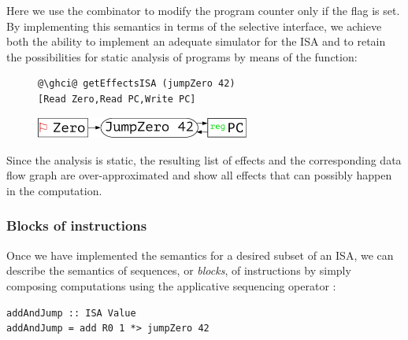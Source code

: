 \noindent
Here we use the  combinator to modify the program counter only if
the  flag is set. By implementing this semantics in terms of the
selective interface, we achieve both the ability to implement an adequate
simulator for the ISA and to retain the possibilities for static analysis of
programs by means of the  function:

\begin{figure}[!h]
 \begin{minipage}{0.45\textwidth}
\raggedleft
\begin{verbatim}
@\ghci@ getEffectsISA (jumpZero 42)
[Read Zero,Read PC,Write PC]
\end{verbatim}
 \end{minipage}
 \begin{minipage}{0.45\textwidth}
  \centering
  \includegraphics[width=7cm]{./fig/jumpZero.pdf}
 \end{minipage}
\end{figure}

\noindent
Since the analysis is static, the resulting list of effects and the
corresponding data flow graph are over-approximated and show all effects that
can possibly happen in the computation.


\subsubsection{Blocks of instructions}

Once we have implemented the semantics for a desired subset of an ISA, we can
describe the semantics of sequences, or \emph{blocks}, of instructions by
simply composing  computations using the applicative sequencing operator
\hs{*>}:

\vspace{1mm}
\begin{verbatim}
addAndJump :: ISA Value
addAndJump = add R0 1 *> jumpZero 42
\end{verbatim}
\vspace{1mm}

